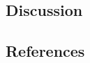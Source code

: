 \documentclass[
  letterpaper,
  DIV=11,
  numbers=noendperiod]{scrartcl}
\begin{document}
\subsection{\texorpdfstring{\textbf{Discussion}}{Discussion}}\label{discussion}

\hfill\break

\subsection{\texorpdfstring{\textbf{References}}{References}}\label{references}

\hfill\break

\subsubsection{}\label{section}

\hfill\break

\hfill\break
\end{document}
